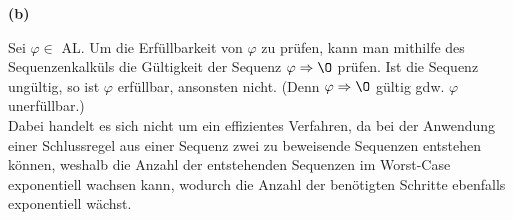 \documentclass[11pt, a4paper]{article}
\begin{document}
\textbf{(b)}
\begin{adjustwidth}{20pt}{20pt}
Sei $\varphi \in $ AL. Um die Erfüllbarkeit von $\varphi$ zu prüfen, kann man mithilfe des Sequenzenkalküls die Gültigkeit der Sequenz $\varphi \Rightarrow \O$ prüfen. Ist die Sequenz
ungültig, so ist $\varphi$ erfüllbar, ansonsten nicht. (Denn $\varphi \Rightarrow \O$ gültig gdw. $\varphi$ unerfüllbar.)\\
Dabei handelt es sich nicht um ein effizientes Verfahren, da bei der Anwendung einer Schlussregel aus einer Sequenz zwei zu beweisende Sequenzen entstehen können, weshalb
die Anzahl der entstehenden Sequenzen im Worst-Case exponentiell wachsen kann, wodurch die Anzahl der benötigten Schritte ebenfalls exponentiell wächst.
\end{adjustwidth}
\end{document}
